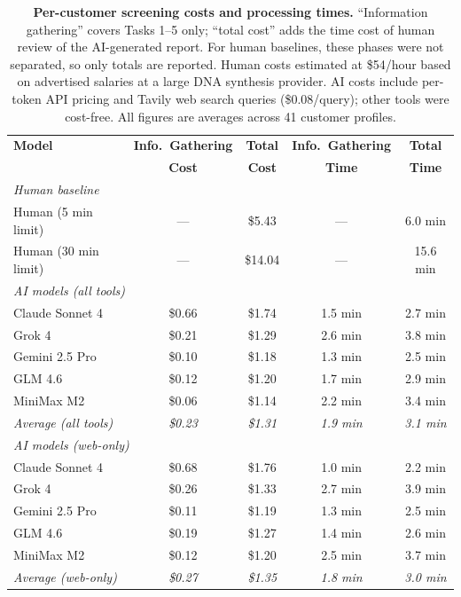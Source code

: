 \documentclass[utf8]{FrontiersinHarvard}
\begin{document}
\begin{table}[!t]
\centering
\caption{\textbf{Per-customer screening costs and processing times.} ``Information gathering'' covers Tasks 1--5 only; ``total cost'' adds the time cost of human review of the AI-generated report. For human baselines, these phases were not separated, so only totals are reported. Human costs estimated at \$54/hour based on advertised salaries at a large DNA synthesis provider. AI costs include per-token API pricing and Tavily web search queries (\$0.08/query); other tools were cost-free. All figures are averages across 41 customer profiles.}
\label{tab:costs}
\small
\begin{tabular}{lcccc}
\toprule
\textbf{Model} & \textbf{Info.\ Gathering} & \textbf{Total} & \textbf{Info.\ Gathering} & \textbf{Total} \\
 & \textbf{Cost} & \textbf{Cost} & \textbf{Time} & \textbf{Time} \\
\midrule
\multicolumn{5}{l}{\textit{Human baseline}} \\
Human (5 min limit) & --- & \$5.43 & --- & 6.0 min \\
Human (30 min limit) & --- & \$14.04 & --- & 15.6 min \\
\midrule
\multicolumn{5}{l}{\textit{AI models (all tools)}} \\
Claude Sonnet 4 & \$0.66 & \$1.74 & 1.5 min & 2.7 min \\
Grok 4 & \$0.21 & \$1.29 & 2.6 min & 3.8 min \\
Gemini 2.5 Pro & \$0.10 & \$1.18 & 1.3 min & 2.5 min \\
GLM 4.6 & \$0.12 & \$1.20 & 1.7 min & 2.9 min \\
MiniMax M2 & \$0.06 & \$1.14 & 2.2 min & 3.4 min \\
\textit{Average (all tools)} & \textit{\$0.23} & \textit{\$1.31} & \textit{1.9 min} & \textit{3.1 min} \\
\midrule
\multicolumn{5}{l}{\textit{AI models (web-only)}} \\
Claude Sonnet 4 & \$0.68 & \$1.76 & 1.0 min & 2.2 min \\
Grok 4 & \$0.26 & \$1.33 & 2.7 min & 3.9 min \\
Gemini 2.5 Pro & \$0.11 & \$1.19 & 1.3 min & 2.5 min \\
GLM 4.6 & \$0.19 & \$1.27 & 1.4 min & 2.6 min \\
MiniMax M2 & \$0.12 & \$1.20 & 2.5 min & 3.7 min \\
\textit{Average (web-only)} & \textit{\$0.27} & \textit{\$1.35} & \textit{1.8 min} & \textit{3.0 min} \\
\bottomrule
\end{tabular}
\end{table}
\end{document}
